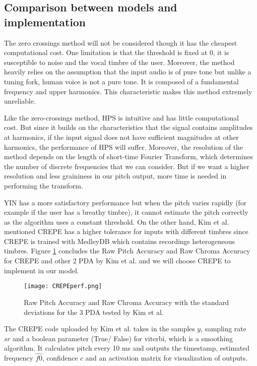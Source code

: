 \subsection{Comparison between models and implementation}
The zero crossings method will not be considered though it has the cheapest computational cost. One limitation is that
the threshold is fixed at 0, it is susceptible to noise and the vocal timbre of the user. Moreover, the method heavily relies on
the assumption that the input audio is of pure tone but unlike a tuning fork, human voice is not a pure tone. It is 
composed of a fundamental frequency and upper harmonics. \cite{humanmono} This characteristic makes this method extremely
unreliable.

Like the zero-crossings method, HPS is intuitive and has little computational cost. But since it builds on the characteristics 
that the signal contains amplitudes at harmonics, if the input signal does not have sufficient magnitudes at other harmonics, the 
performance of HPS will suffer. Moreover, the resolution of the method depends on the length of short-time Fourier Transform, which
determines the number of discrete frequencies that we can consider. But if we want a higher resolution and less graininess in our 
pitch output, more time is needed in performing the transform.

YIN has a more satisfactory performance but when the pitch varies rapidly (for example if the user has a breathy timbre), it cannot 
estimate the pitch correctly as the algorithm uses a constant threshold. On the other hand, Kim et al. mentioned CREPE has a higher 
tolerance for inputs with different timbres since CREPE is trained with MedleyDB which contains recordings heterogeneous timbres. Figure 
\ref{CREPEperf} concludes the Raw Pitch Accuracy and Raw Chroma Accuracy for CREPE and other 2 PDA by Kim et al. and we will choose CREPE 
to implement in our model.

\begin{figure}
	\texttt{[image: CREPEperf.png]}
	\caption{Raw Pitch Accuracy and Raw Chroma Accuracy with the standard deviations for the 3 PDA tested by Kim et al. \cite{CREPE}}
	\label{CREPEperf}
\end{figure}

The CREPE code uploaded by Kim et al. takes in the samples $y$, sampling rate $sr$ and a boolean parameter (True/ False) for viterbi, which is a smoothing algorithm. 
It calculates pitch every 10 ms and outputs the timestamp, estimated frequency $\hat{f0}$, confidence $c$ and an activation matrix for visualization of outputs. 

